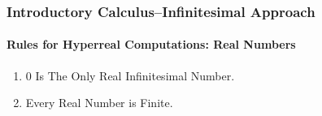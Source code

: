 \begin{frame}
\frametitle{Introductory Calculus--Infinitesimal Approach}
\framesubtitle{Rules for Hyperreal Computations: Real Numbers}
\label{slide:1.5-15}
\begin{hyperrule}
\begin{enumerate}
\item $0$ Is The Only Real Infinitesimal Number.
\item Every Real Number is Finite.
\end{enumerate}
\end{hyperrule}
\end{frame}
